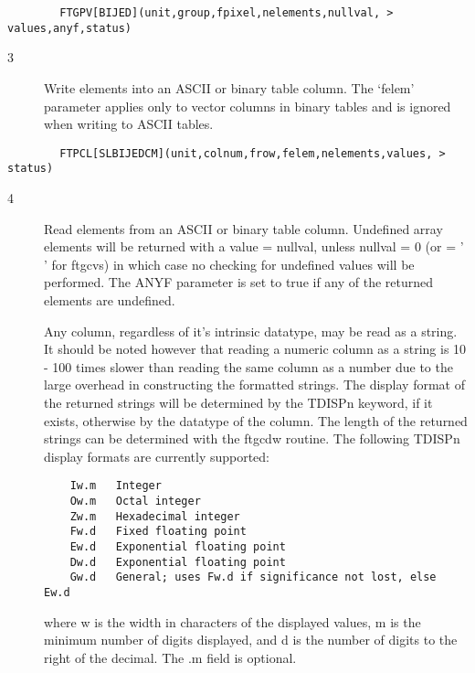 \documentclass[11pt]{book}
\begin{document}
\begin{verbatim}
        FTGPV[BIJED](unit,group,fpixel,nelements,nullval, > values,anyf,status)
\end{verbatim}

\begin{description}
\item[3 ] Write elements into an ASCII or binary table column. The `felem'
    parameter applies only to vector columns in binary tables and is
   ignored when writing to ASCII tables.
\end{description}

\begin{verbatim}
        FTPCL[SLBIJEDCM](unit,colnum,frow,felem,nelements,values, > status)
\end{verbatim}

\begin{description}
\item[4 ] Read elements from an ASCII or binary table column.  Undefined
    array elements will be returned with a value = nullval, unless nullval = 0
    (or = ' ' for ftgcvs) in which case no checking for undefined values will
    be performed. The ANYF parameter is set to true if any of the returned
    elements are undefined.

    Any column, regardless of it's intrinsic datatype, may be read as a
    string.  It should be noted however that reading a numeric column
    as a string is 10 - 100 times slower than reading the same column
    as a number due to the large overhead in constructing the formatted
    strings.  The display format of the returned strings will be
    determined by the TDISPn keyword, if it exists, otherwise by the
    datatype of the column.  The length of the returned strings  can be
    determined with the ftgcdw routine.  The following TDISPn display
    formats are currently supported:

\begin{verbatim}
    Iw.m   Integer
    Ow.m   Octal integer
    Zw.m   Hexadecimal integer
    Fw.d   Fixed floating point
    Ew.d   Exponential floating point
    Dw.d   Exponential floating point
    Gw.d   General; uses Fw.d if significance not lost, else Ew.d
\end{verbatim}
  where w is the width in characters of the displayed values, m is the minimum
  number of digits displayed, and d is the number of digits to the right of the
  decimal.  The .m field is optional.
\end{description}
\end{document}
